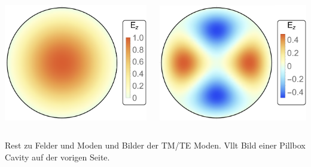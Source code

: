 \documentclass[12pt,xcolor=dvipsnames,professionalfonts]{beamer}
\begin{document}
\begin{frame}
	\begin{columns}[T]
		\centering
		\includegraphics[scale=0.4]{./figures/tm010.pdf}
		
		\includegraphics[scale=0.4]{./figures/tm210.pdf}
	\end{columns}
	\vspace*{0.4cm}
	Rest zu Felder und Moden und Bilder der TM/TE Moden.
	Vllt Bild einer Pillbox Cavity auf der vorigen Seite.
\end{frame}
\end{document}
